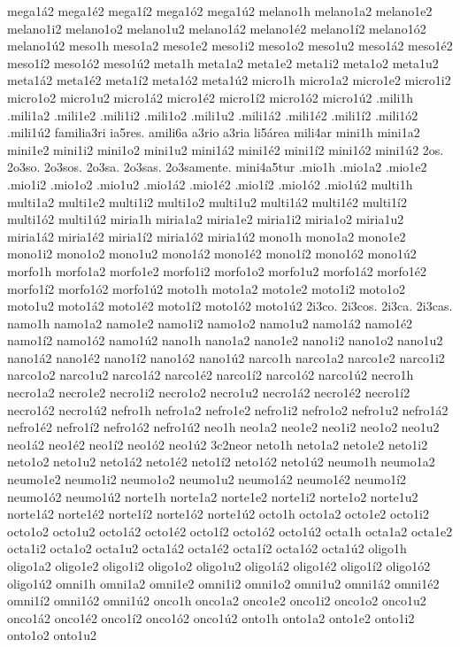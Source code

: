 {mega1á2 mega1é2 mega1í2 mega1ó2 mega1ú2
melano1h
melano1a2 melano1e2 melano1i2 melano1o2 melano1u2
melano1á2 melano1é2 melano1í2 melano1ó2 melano1ú2
meso1h
meso1a2 meso1e2 meso1i2 meso1o2 meso1u2
meso1á2 meso1é2 meso1í2 meso1ó2 meso1ú2
meta1h
meta1a2 meta1e2 meta1i2 meta1o2 meta1u2
meta1á2 meta1é2 meta1í2 meta1ó2 meta1ú2
micro1h
micro1a2 micro1e2 micro1i2 micro1o2 micro1u2
micro1á2 micro1é2 micro1í2 micro1ó2 micro1ú2
.mili1h
.mili1a2 .mili1e2 .mili1i2 .mili1o2 .mili1u2
.mili1á2 .mili1é2 .mili1í2 .mili1ó2 .mili1ú2
familia3ri
ia5res.
amili6a
a3rio
a3ria
li5área
mili4ar
mini1h
mini1a2 mini1e2 mini1i2 mini1o2 mini1u2
mini1á2 mini1é2 mini1í2 mini1ó2 mini1ú2
2os.
2o3so.
2o3sos.
2o3sa.
2o3sas.
2o3samente.
mini4a5tur
.mio1h
.mio1a2 .mio1e2 .mio1i2 .mio1o2 .mio1u2
.mio1á2 .mio1é2 .mio1í2 .mio1ó2 .mio1ú2
multi1h
multi1a2 multi1e2 multi1i2 multi1o2 multi1u2
multi1á2 multi1é2 multi1í2 multi1ó2 multi1ú2
miria1h
miria1a2 miria1e2 miria1i2 miria1o2 miria1u2
miria1á2 miria1é2 miria1í2 miria1ó2 miria1ú2
mono1h
mono1a2 mono1e2 mono1i2 mono1o2 mono1u2
mono1á2 mono1é2 mono1í2 mono1ó2 mono1ú2
morfo1h
morfo1a2 morfo1e2 morfo1i2 morfo1o2 morfo1u2
morfo1á2 morfo1é2 morfo1í2 morfo1ó2 morfo1ú2
moto1h
moto1a2 moto1e2 moto1i2 moto1o2 moto1u2
moto1á2 moto1é2 moto1í2 moto1ó2 moto1ú2
2i3co.
2i3cos.
2i3ca.
2i3cas.
namo1h
namo1a2 namo1e2 namo1i2 namo1o2 namo1u2
namo1á2 namo1é2 namo1í2 namo1ó2 namo1ú2
nano1h
nano1a2 nano1e2 nano1i2 nano1o2 nano1u2
nano1á2 nano1é2 nano1í2 nano1ó2 nano1ú2
narco1h
narco1a2 narco1e2 narco1i2 narco1o2 narco1u2
narco1á2 narco1é2 narco1í2 narco1ó2 narco1ú2
necro1h
necro1a2 necro1e2 necro1i2 necro1o2 necro1u2
necro1á2 necro1é2 necro1í2 necro1ó2 necro1ú2
nefro1h
nefro1a2 nefro1e2 nefro1i2 nefro1o2 nefro1u2
nefro1á2 nefro1é2 nefro1í2 nefro1ó2 nefro1ú2
neo1h
neo1a2 neo1e2 neo1i2 neo1o2 neo1u2
neo1á2 neo1é2 neo1í2 neo1ó2 neo1ú2
3c2neor
neto1h
neto1a2 neto1e2 neto1i2 neto1o2 neto1u2
neto1á2 neto1é2 neto1í2 neto1ó2 neto1ú2
neumo1h
neumo1a2 neumo1e2 neumo1i2 neumo1o2 neumo1u2
neumo1á2 neumo1é2 neumo1í2 neumo1ó2 neumo1ú2
norte1h
norte1a2 norte1e2 norte1i2 norte1o2 norte1u2
norte1á2 norte1é2 norte1í2 norte1ó2 norte1ú2
octo1h
octo1a2 octo1e2 octo1i2 octo1o2 octo1u2
octo1á2 octo1é2 octo1í2 octo1ó2 octo1ú2
octa1h
octa1a2 octa1e2 octa1i2 octa1o2 octa1u2
octa1á2 octa1é2 octa1í2 octa1ó2 octa1ú2
oligo1h
oligo1a2 oligo1e2 oligo1i2 oligo1o2 oligo1u2
oligo1á2 oligo1é2 oligo1í2 oligo1ó2 oligo1ú2
omni1h
omni1a2 omni1e2 omni1i2 omni1o2 omni1u2
omni1á2 omni1é2 omni1í2 omni1ó2 omni1ú2
onco1h
onco1a2 onco1e2 onco1i2 onco1o2 onco1u2
onco1á2 onco1é2 onco1í2 onco1ó2 onco1ú2
onto1h
onto1a2 onto1e2 onto1i2 onto1o2 onto1u2
}
